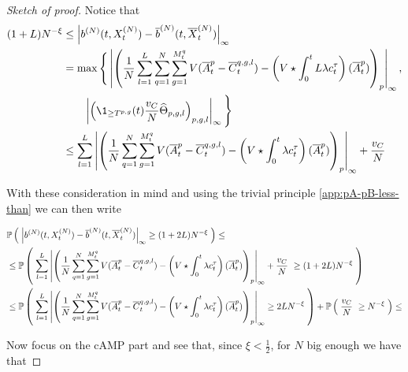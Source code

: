 \begin{proof}[Sketch of proof]
	Notice that
	\begin{align*}
		(1+\NumCampRelease)N^{-\xi} 
		&\leq 
		\norm{
			\drift^{(N)}(t, \sol_t^{(N)}) - \mfdrift^{(N)}(t, \mfsol_t^{(N)})
		}_\infty
		\\
		&= 
		\max 
		\Bigg\{
		\norm{
			\left(
			\frac{1}{N} \sum _{l = 1}^{\NumCampRelease} \sum _{q = 1}^{N} \sum_{g = 1}^{\hmactive_t^q} \attraction(\mfamba_t^p - \mfcamp_t^{q,g,l}) 
			-
			\left( \attraction \star \int_0^t \NumCampRelease\lambda \cdens_t^\tau \right) (\mfamba_t^p)
			\right)_{p}
		}_\infty,
		\\
		&\qquad
		\norm{
			\left(
			\1_{\geq \btime^{p,g}}(t)  \frac{\cdrift}{N}  \cgonia_{p,g,l} 
			\right)_{p,g,l}
		}_\infty
		\Bigg\}
		\\
		&\leq
		\sum _{l = 1}^{\NumCampRelease} 
		\norm{
			\left(
			\frac{1}{N} \sum _{q = 1}^{N} \sum_{g = 1}^{\hmactive_t^q} \attraction(\mfamba_t^p - \mfcamp_t^{q,g,l}) 
			-
			\left( \attraction \star \int_0^t \lambda \cdens_t^\tau \right) (\mfamba_t^p)
			\right)_{p}
		}_\infty
		+
		\frac{\cdrift}{N}
	\end{align*}
	
	With these consideration in mind and using the trivial principle \ref{app:pA-pB-less-than} we can then write
	
	\begin{align*}
		&\mathbb{P} \left( \; 
			\left| 
				b^{(N)}(t, X_t^{(N)}) - \overline{b}^{(N)}(t, \overline{X}_t^{(N)})
			 \right|_\infty
			\geq
			(1+2L)N^{-\xi}
		 \; \right)
		\leq
		\\
		&\leq
		\mathbb{P} \left( \; 
		\sum _{l = 1}^{L} 
		\left| 
			\left(
			\frac{1}{N} \sum _{q = 1}^{N} \sum_{g = 1}^{M_t^q} V(\overline{A}_t^p - \overline{C}_t^{q,g,l}) 
			-
			\left( V \star \int_0^t \lambda c_t^\tau \right) (\overline{A}_t^p)
			\right)_{p}
		 \right|_\infty
		+
		\frac{v_C}{N}\
		\geq
		(1+2L)N^{-\xi}
		 \; \right)
		\\
		&\leq
		\mathbb{P} \left( \; 
			\sum _{l = 1}^{L} 
			\left| 
				\left(
				\frac{1}{N} \sum _{q = 1}^{N} \sum_{g = 1}^{M_t^q} V(\overline{A}_t^p - \overline{C}_t^{q,g,l}) 
				-
				\left( V \star \int_0^t \lambda c_t^\tau \right) (\overline{A}_t^p)
				\right)_{p}
			 \right|_\infty
			\geq
			2L N^{-\xi}
		 \; \right)
		+
		\mathbb{P} \left( \; 
			\frac{v_C}{N}\
			\geq
			N^{-\xi}
		 \; \right)
		\leq
	\end{align*}
	
	Now focus on the cAMP part and see that, since $\xi < \frac{1}{2}$, for $N$ big enough we have that
	

\end{proof}
